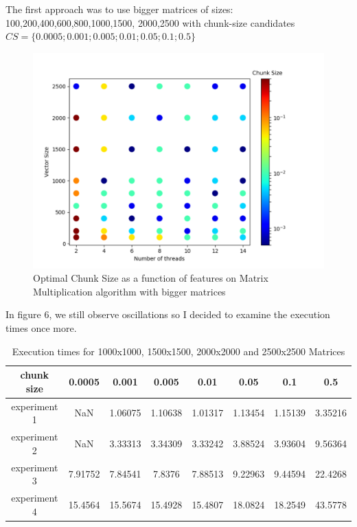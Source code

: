 The first approach was to use bigger matrices of sizes:
100,200,400,600,800,1000,1500,
2000,2500 with chunk-size candidates $CS=\{0.0005;0.001; 0.005; 0.01; 0.05; 0.1;0.5\}$

\begin{figure}[H]
	\centering
	\includegraphics[width=120mm]{images/chunk_size_function_matrix_big.pdf}
	\caption{Optimal Chunk Size as a function of features on Matrix Multiplication algorithm with bigger matrices}
\end{figure}

In figure 6, we still observe oscillations so I decided to examine the execution times once more.

\begin{table}[h]
	\centering
	\caption{Execution times for 1000x1000, 1500x1500, 2000x2000 and 2500x2500 Matrices}
	\label{my-label}
	\begin{tabular}{|c|c|c|c|c|c|c|c|}
		\hline
		chunk size&0.0005  & 0.001   & 0.005   & 0.01    & 0.05    & 0.1     & 0.5     \\ \hline
		experiment 1&NaN     & 1.06075 & 1.10638 & 1.01317 & 1.13454 & 1.15139 & 3.35216 \\ \hline
		experiment 2&NaN     & 3.33313 & 3.34309 & 3.33242 & 3.88524 & 3.93604 & 9.56364 \\ \hline
		experiment 3&7.91752 & 7.84541 & 7.8376  & 7.88513 & 9.22963 & 9.44594 & 22.4268 \\ \hline
		experiment 4& 15.4564 & 15.5674 & 15.4928 & 15.4807 & 18.0824 & 18.2549 & 43.5778 \\ \hline
	\end{tabular}
\end{table}

